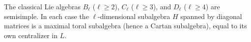 The classical Lie algebras $B_\ell$ ($\ell \geq 2$), $C_\ell$ ($\ell \geq 3$), and $D_\ell$ ($\ell \geq 4$) are semisimple. In each case the $\ell$-dimensional subalgebra $H$ spanned by diagonal matrices is a maximal toral subalgebra (hence a Cartan subalgebra), equal to its own centralizer in $L$.
